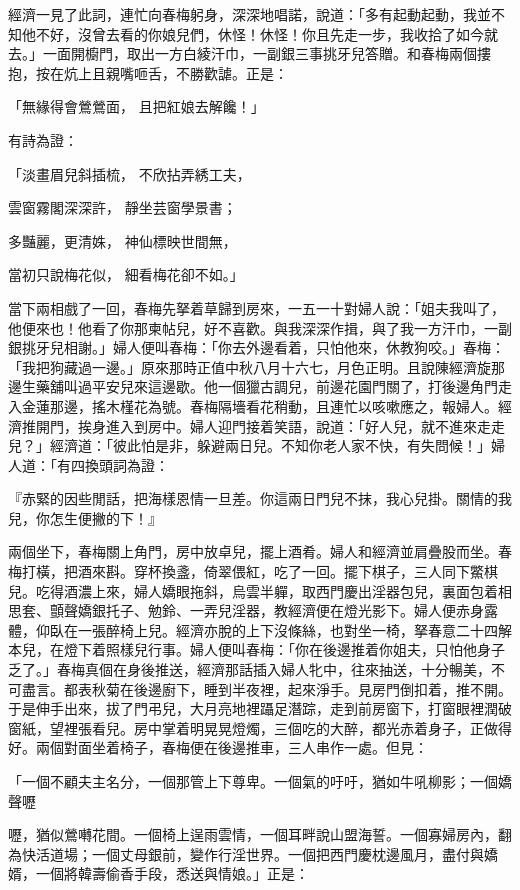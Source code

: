 經濟一見了此詞，連忙向春梅躬身，深深地唱諾，說道：「多有起動起動，我並不知他不好，沒曾去看的你娘兒們，休怪！休怪！你且先走一步，我收拾了如今就去。」一面開櫥門，取出一方白綾汗巾，一副銀三事挑牙兒答贈。和春梅兩個摟抱，按在炕上且親嘴咂舌，不勝歡謔。正是：

「無緣得會鶯鶯面，  且把紅娘去解饞！」

有詩為證：

「淡畫眉兒斜插梳，  不欣拈弄綉工夫，

雲窗霧閣深深許，  靜坐芸窗學景書；

多豔麗，更清姝，  神仙標映世間無，

當初只說梅花似，  細看梅花卻不如。」

當下兩相戲了一回，春梅先拏着草歸到房來，一五一十對婦人說：「姐夫我叫了，他便來也！他看了你那柬帖兒，好不喜歡。與我深深作揖，與了我一方汗巾，一副銀挑牙兒相謝。」婦人便叫春梅：「你去外邊看着，只怕他來，休教狗咬。」春梅：「我把狗藏過一邊。」原來那時正值中秋八月十六七，月色正明。且說陳經濟旋那邊生藥舖叫過平安兒來這邊歇。他一個獵古調兒，前邊花園門關了，打後邊角門走入金蓮那邊，搖木槿花為號。春梅隔墻看花稍動，且連忙以咳嗽應之，報婦人。經濟推開門，挨身進入到房中。婦人迎門接着笑語，說道：「好人兒，就不進來走走兒？」經濟道：「彼此怕是非，躲避兩日兒。不知你老人家不快，有失問候！」婦人道：「有四換頭詞為證：

『赤緊的因些閒話，把海樣恩情一旦差。你這兩日門兒不抹，我心兒掛。關情的我兒，你怎生便撇的下！』

兩個坐下，春梅關上角門，房中放卓兒，擺上酒肴。婦人和經濟並肩疊股而坐。春梅打橫，把酒來斟。穿杯換盞，倚翠偎紅，吃了一回。擺下棋子，三人同下鱉棋兒。吃得酒濃上來，婦人嬌眼拖斜，烏雲半軃，取西門慶出淫器包兒，裏面包着相思套、顫聲嬌銀托子、勉鈴、一弄兒淫器，教經濟便在燈光影下。婦人便赤身露體，仰臥在一張醉椅上兒。經濟亦脫的上下沒條絲，也對坐一椅，拏春意二十四解本兒，在燈下着照樣兒行事。婦人便叫春梅：「你在後邊推着你姐夫，只怕他身子乏了。」春梅真個在身後推送，經濟那話插入婦人牝中，往來抽送，十分暢美，不可盡言。都表秋菊在後邊廚下，睡到半夜裡，起來淨手。見房門倒扣着，推不開。于是伸手出來，拔了門弔兒，大月亮地裡躡足潛踪，走到前房窗下，打窗眼裡潤破窗紙，望裡張看兒。房中掌着明晃晃燈燭，三個吃的大醉，都光赤着身子，正做得好。兩個對面坐着椅子，春梅便在後邊推車，三人串作一處。但見：

「一個不顧夫主名分，一個那管上下尊卑。一個氣的吁吁，猶如牛吼柳影；一個嬌聲嚦

嚦，猶似鶯囀花間。一個椅上逞雨雲情，一個耳畔說山盟海誓。一個寡婦房內，翻為快活道場；一個丈母銀前，變作行淫世界。一個把西門慶枕邊風月，盡付與嬌婿，一個將韓壽偷香手段，悉送與情娘。」正是：

